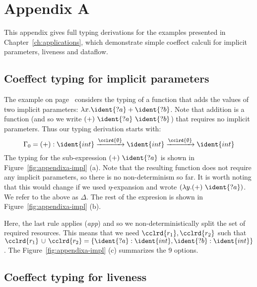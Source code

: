 
\chapter{Appendix A} 
\label{ch:appendix} 

This appendix gives full typing derivations for the examples presented in Chapter~\ref{ch:applications},
which demonstrate simple coeffect calculi for implicit parameters, liveness and dataflow.


\section{Coeffect typing for implicit parameters}
\label{sec:appendixa-implicit} 

The example on page~\pageref{pg:applications-flat-paramsex} considers the typing of a function that
adds the values of two implicit parameters: $\lambda x.\ident{?a} + \ident{?b}$. Note that addition
is a function (and so we write $(+)~\ident{?a}~\ident{?b}$) that requires no implicit parameters.
Thus our typing derivation starts with: 
%
\begin{equation*}
\Gamma_0 = (+):\ident{int}\xrightarrow{\cclrd{\emptyset}}\ident{int}\xrightarrow{\cclrd{\emptyset}}\ident{int}
\end{equation*}
%
The typing for the sub-expression $(+)~\ident{?a}$ is shown in Figure~\ref{fig:appendixa-impl} (a).
Note that the resulting function does not require any implicit parameters, so there is no non-determinism so far.
It is worth noting that this would change if we used $\eta$-expansion and wrote $(\lambda y.(+)~\ident{?a})$.
We refer to the above as $\Delta$. The rest of the expresion is shown in Figure~\ref{fig:appendixa-impl} (b).

Here, the last rule applies (\emph{app}) and so we non-deterministically split the set of required resources.
This means that we need $\cclrd{r_1}, \cclrd{r_2}$ such that $\cclrd{r_1}\,\cup\,\cclrd{r_2}=\{\ident{?a}:\ident{int}, \ident{?b}:\ident{int} \}$.
The Figure~\ref{fig:appendixa-impl} (c) summarizes the 9 options.


\section{Coeffect typing for liveness}
\label{sec:appendixa-liveness} 

